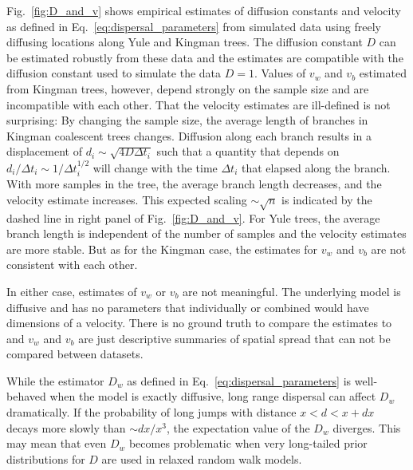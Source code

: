 \documentclass[aps,rmp, twocolumn]{revtex4}
\begin{document}
Fig.~\ref{fig:D_and_v} shows empirical estimates of diffusion constants and velocity as defined in Eq.~\ref{eq:dispersal_parameters} from simulated data using freely diffusing locations along Yule and Kingman trees.
The diffusion constant $D$ can be estimated robustly from these data and the estimates are compatible with the diffusion constant used to simulate the data $D=1$.
Values of $v_w$ and $v_b$ estimated from Kingman trees, however, depend strongly on the sample size and are incompatible with each other.
That the velocity estimates are ill-defined is not surprising: By changing the sample size, the average length of branches in Kingman coalescent trees changes.
Diffusion along each branch results in a displacement of $d_i \sim \sqrt{4D\Delta t_i}$ such that a quantity that depends on $d_i / \Delta t_i \sim 1/\Delta t_i^{1/2}$ will change with the time $\Delta t_i$ that elapsed along the branch.
With more samples in the tree, the average branch length decreases, and the velocity estimate increases.
This expected scaling $\sim \sqrt{n}$ is indicated by the dashed line in right panel of Fig.~\ref{fig:D_and_v}.
For Yule trees, the average branch length is independent of the number of samples and the velocity estimates are more stable.
But as for the Kingman case, the estimates for $v_w$ and $v_b$ are not consistent with each other.

In either case, estimates of $v_w$ or $v_b$ are not meaningful.
The underlying model is diffusive and has no parameters that individually or combined would have dimensions of a velocity.
There is no ground truth to compare the estimates to and $v_w$ and $v_b$ are just descriptive summaries of spatial spread that can not be compared between datasets.

While the estimator $D_w$ as defined in Eq.~\ref{eq:dispersal_parameters} is well-behaved when the model is exactly diffusive, long range dispersal can affect $D_w$ dramatically.
If the probability of long jumps with distance $x<d<x+dx$ decays more slowly than $\sim dx/x^3$, the expectation value of the $D_w$ diverges.
This may mean that even $D_w$ becomes problematic when very long-tailed prior distributions for $D$ are used in relaxed random walk models.
\end{document}
